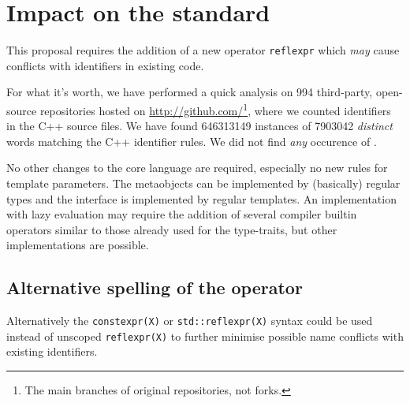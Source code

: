 \section{Impact on the standard}

This proposal requires the addition of a new operator
\texttt{reflexpr} which {\em may} cause conflicts with identifiers in existing code.

For what it's worth, we have performed a quick analysis on \num{994} third-party, open-source
repositories hosted on \url{http://github.com/}\footnote{The main branches
of original repositories, not forks.}, where we counted identifiers
in the C++ source files. We have found \num{646313149} instances of
\num{7903042} {\em distinct} words matching the C++ identifier rules.
We did not find {\em any} occurence of .

No other changes to the core language are required, especially no new rules
for template parameters. The metaobjects can be implemented by (basically) regular
types and the interface is implemented by regular templates.
An implementation with lazy evaluation may require the addition of several compiler builtin
operators similar to those already used for the type-traits, but other
implementations are possible.

\subsection{Alternative spelling of the operator}

Alternatively the \texttt{constexpr(X)} or \texttt{std::reflexpr(X)} syntax could 
be used instead of unscoped \texttt{reflexpr(X)} to further minimise possible name
conflicts with existing identifiers.
